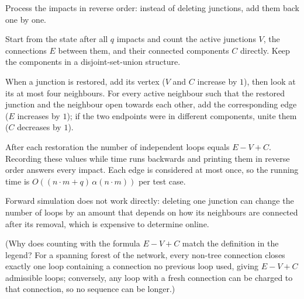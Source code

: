 Process the impacts in reverse order: instead of deleting junctions, add them back one by one.

Start from the state after all $q$ impacts and count the active junctions $V$, the connections $E$ between them, and their connected components $C$ directly. Keep the components in a disjoint-set-union structure.

When a junction is restored, add its vertex ($V$ and $C$ increase by $1$), then look at its at most four neighbours. For every active neighbour such that the restored junction and the neighbour open towards each other, add the corresponding edge ($E$ increases by $1$); if the two endpoints were in different components, unite them ($C$ decreases by $1$).

After each restoration the number of independent loops equals $E - V + C$. Recording these values while time runs backwards and printing them in reverse order answers every impact. Each edge is considered at most once, so the running time is $O((n \cdot m + q)\, \alpha(n \cdot m))$ per test case.

Forward simulation does not work directly: deleting one junction can change the number of loops by an amount that depends on how its neighbours are connected after its removal, which is expensive to determine online.

(Why does counting with the formula $E - V + C$ match the definition in the legend? For a spanning forest of the network, every non-tree connection closes exactly one loop containing a connection no previous loop used, giving $E - V + C$ admissible loops; conversely, any loop with a fresh connection can be charged to that connection, so no sequence can be longer.)
